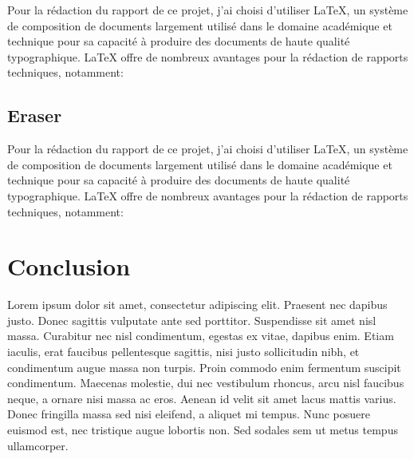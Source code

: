 \hspace{16pt}Pour la rédaction du rapport de ce projet, j'ai choisi d'utiliser \LaTeX, un système de composition de documents largement utilisé dans le domaine académique et technique pour sa capacité à produire des documents de haute qualité typographique. \LaTeX\xspace offre de nombreux avantages pour la rédaction de rapports techniques, notamment:


\subsection{Eraser}

\hspace{16pt}Pour la rédaction du rapport de ce projet, j'ai choisi d'utiliser \LaTeX, un système de composition de documents largement utilisé dans le domaine académique et technique pour sa capacité à produire des documents de haute qualité typographique. \LaTeX\xspace offre de nombreux avantages pour la rédaction de rapports techniques, notamment:


\newpage

\section*{Conclusion}


Lorem ipsum dolor sit amet, consectetur adipiscing elit. Praesent nec dapibus justo. Donec sagittis vulputate ante sed porttitor. Suspendisse sit amet nisl massa. Curabitur nec nisl condimentum, egestas ex vitae, dapibus enim. Etiam iaculis, erat faucibus pellentesque sagittis, nisi justo sollicitudin nibh, et condimentum augue massa non turpis. Proin commodo enim fermentum suscipit condimentum. Maecenas molestie, dui nec vestibulum rhoncus, arcu nisl faucibus neque, a ornare nisi massa ac eros. Aenean id velit sit amet lacus mattis varius. Donec fringilla massa sed nisi eleifend, a aliquet mi tempus. Nunc posuere euismod est, nec tristique augue lobortis non. Sed sodales sem ut metus tempus ullamcorper.


























